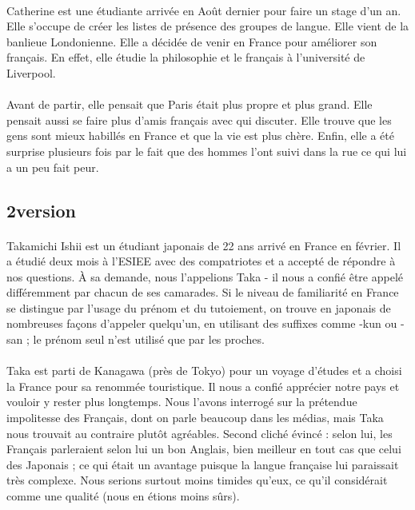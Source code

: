 \paragraph{}
Catherine est une étudiante arrivée en Août dernier pour faire un stage d’un an. Elle s’occupe de créer les listes de présence des groupes de langue. Elle vient de la banlieue Londonienne. Elle a décidée de venir en France pour améliorer son français. En effet, elle étudie la philosophie et le français à l’université de Liverpool.
\paragraph{}
Avant de partir, elle pensait que Paris était plus propre et plus grand. Elle pensait aussi se faire plus d’amis français avec qui discuter.  Elle trouve que les gens sont mieux habillés en France et que la vie est plus chère. Enfin,  elle a été surprise plusieurs fois par le fait que des hommes l’ont suivi dans la rue ce qui lui a un peu fait peur.


\subsection{2\ieme version}
\paragraph{}
Takamichi Ishii est un étudiant japonais de 22 ans arrivé en France en février. Il a étudié deux mois à l’ESIEE avec des compatriotes et a accepté de répondre à nos questions. À sa demande, nous l’appelions Taka - il nous a confié être appelé différemment par chacun de ses camarades. Si le niveau de familiarité en France se distingue par l’usage du prénom et du tutoiement, on trouve en japonais de nombreuses façons d’appeler quelqu’un, en utilisant des suffixes comme -kun ou -san ; le prénom seul n’est utilisé que par les proches.
\paragraph{}
Taka est parti de Kanagawa (près de Tokyo) pour un voyage d’études et a choisi la France pour sa renommée touristique. Il nous a confié apprécier notre pays et vouloir y rester plus longtemps. Nous l’avons interrogé sur la prétendue impolitesse des Français, dont on parle beaucoup dans les médias, mais Taka nous trouvait au contraire plutôt agréables. Second cliché évincé : selon lui, les Français parleraient selon lui un bon Anglais, bien meilleur en tout cas  que celui des Japonais ; ce qui était un avantage puisque la langue française lui paraissait très complexe. Nous serions surtout moins timides qu’eux, ce qu’il considérait comme une qualité (nous en étions moins sûrs).
